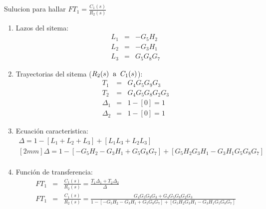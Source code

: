 \documentclass[12pt]{article}
\begin{document}
\begin{tikzpicture}


\end{tikzpicture}

\vspace{1cm}

Sulucion para hallar \( \displaystyle FT_{1}=\frac{C_{1}(s)}{R_{2}(s)} \)

\begin{enumerate}
  \item Lazos del sitema:
    \begin{eqnarray*}
      L_{1} &=& - G_{5}H_{2} \\
      L_{2} &=& - G_{3}H_{1} \\
      L_{3} &=& G_{5}G_{8}G_{7}
    \end{eqnarray*}
  \item Trayectorias del sitema ($R_{2}(s) \hspace{2mm} \text{a} \hspace{2mm} C_{1}(s)$):
    \begin{eqnarray*}
      T_{1} &=& G_{4}G_{5}G_{9}G_{3} \\
      T_{2} &=& G_{4}G_{5}G_{8}G_{2}G_{3} \\
      \Delta_{1} &=& 1-[0]=1 \\
      \Delta_{2} &=& 1-[0]=1
    \end{eqnarray*}
  \item Ecuaci\'on caracteristica:
    \begin{eqnarray*}
      \Delta = 1-[L_{1}+L_{2}+L_{3}]+[L_{1}L_{3}+L_{2}L_{3}] \\ [2mm]
      \Delta = 1-[-G_{5}H_{2}-G_{3}H_{1}+G_{5}G_{8}G_{7}]+[G_{5}H_{2}G_{3}H_{1}-G_{3}H_{1}G_{5}G_{8}G_{7}]\\
    \end{eqnarray*}
  \item Funci\'on de transferencia:
    \begin{eqnarray*}
      FT_{1} &=& \frac{C_{1}(s)}{R_{2}(s)}=\frac{T_{1}\Delta_{1}+T_{2}\Delta_{2}}{\Delta} \\[5mm]
      FT_{1} &=&\frac{C_{1}(s)}{R_{2}(s)} = \frac{G_{4}G_{5}G_{9}G_{3}+G_{4}G_{5}G_{8}G_{2}G_{3}}{1-[-G_{5}H_{2}-G_{3}H_{1}+G_{5}G_{8}G_{7}]+[G_{5}H_{2}G_{3}H_{1}-G_{3}H_{1}G_{5}G_{8}G_{7}]} \\
    \end{eqnarray*}
\end{enumerate}
\end{document}
